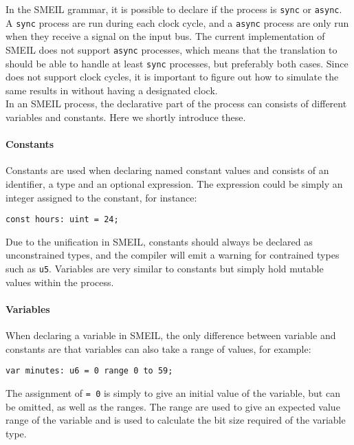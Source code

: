 In the SMEIL grammar, it is possible to declare if the process is \texttt{sync} or \texttt{async}. A \texttt{sync} process are run during each clock cycle, and a \texttt{async} process are only run when they receive a signal on the input bus. The current implementation of SMEIL does not support \texttt{async} processes, which means that the translation to \cspm should be able to handle at least \texttt{sync} processes, but preferably both cases. Since \cspm does not support clock cycles, it is important to figure out how to simulate the same results in \cspm without having a designated clock.
\\

In an SMEIL process, the declarative part of the process can consists of different variables and constants. Here we shortly introduce these.
\paragraph{Constants}
Constants are used when declaring named constant values and consists of an identifier, a type and an optional expression. The expression could be simply an integer assigned to the constant, for instance:
\begin{verbatim}
const hours: uint = 24;
\end{verbatim}
Due to the unification in SMEIL, constants should always be declared as unconstrained types, and the compiler will emit a warning for contrained types such as \texttt{u5}. %
Variables are very similar to constants but simply hold mutable values within the process. %
\paragraph{Variables}
When declaring a variable in SMEIL, the only difference between variable and constants are that variables can also take a range of values, for example:
\begin{verbatim}
var minutes: u6 = 0 range 0 to 59;
\end{verbatim}
The assignment of \texttt{= 0} is simply to give an initial value of the variable, but can be omitted, as well as the ranges. The range are used to give an expected value range of the variable and is used to calculate the bit size required of the variable type.
